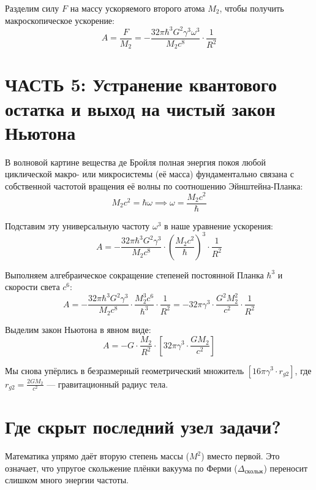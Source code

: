 \documentclass[12pt,a4paper]{article}
\begin{document}
Разделим силу $F$ на массу ускоряемого второго атома $M_2$, чтобы получить макроскопическое ускорение:
\begin{equation}
A = \frac{F}{M_2} = - \frac{32\pi \hbar^3 G^2 \gamma^3 \omega^3}{M_2 c^8} \cdot \frac{1}{R^2}
\end{equation}

\section*{ЧАСТЬ 5: Устранение квантового остатка и выход на чистый закон Ньютона}

В волновой картине вещества де Бройля полная энергия покоя любой циклической макро- или микросистемы (её масса) фундаментально связана с собственной частотой вращения её волны по соотношению Эйнштейна-Планка:
\begin{equation}
M_2 c^2 = \hbar \omega \implies \omega = \frac{M_2 c^2}{\hbar}
\end{equation}

Подставим эту универсальную частоту $\omega^3$ в наше уравнение ускорения:
\begin{equation}
A = - \frac{32\pi \hbar^3 G^2 \gamma^3}{M_2 c^8} \cdot \left( \frac{M_2 c^2}{\hbar} \right)^3 \cdot \frac{1}{R^2}
\end{equation}

Выполняем алгебраическое сокращение степеней постоянной Планка $\hbar^3$ и скорости света $c^6$:
\begin{equation}
A = - \frac{32\pi \hbar^3 G^2 \gamma^3}{M_2 c^8} \cdot \frac{M_2^3 c^6}{\hbar^3} \cdot \frac{1}{R^2} = - 32\pi \gamma^3 \cdot \frac{G^2 M_2^2}{c^2} \cdot \frac{1}{R^2}
\end{equation}

Выделим закон Ньютона в явном виде:
\begin{equation}
A = - G \cdot \frac{M_2}{R^2} \cdot \left[ 32\pi \gamma^3 \cdot \frac{G M_2}{c^2} \right]
\end{equation}

Мы снова упёрлись в безразмерный геометрический множитель $\left[ 16\pi \gamma^3 \cdot r_{g2} \right]$, где $r_{g2} = \frac{2GM_2}{c^2}$ — гравитационный радиус тела.

\section*{Где скрыт последний узел задачи?}

Математика упрямо даёт вторую степень массы ($M^2$) вместо первой. Это означает, что упругое скольжение плёнки вакуума по Ферми ($\Delta_{скольж}$) переносит слишком много энергии частоты.
\end{document}
